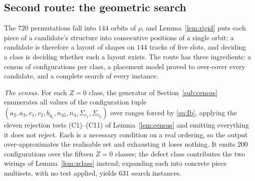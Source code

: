 \documentclass[10pt]{article}
\theoremstyle{remark}
\theoremstyle{plain}
\begin{document}
\subsection{Second route: the geometric search}

The $720$ permutations fall into $144$ orbits of $\rho$, and
Lemma~\ref{lem:rigid} puts each piece of a candidate's structure into
consecutive positions of a single orbit; a candidate is therefore a
layout of shapes on $144$ tracks of five slots, and deciding a class is
deciding whether such a layout exists.  The route has three
ingredients: a census of configurations per class, a placement model
proved to over-cover every candidate, and a complete search of every
instance.

\emph{The census.}  For each $Z=0$ class, the generator of
Section~\ref{sub:census} enumerates all values of the configuration
tuple $(a_2,a_3,c_1,c_2,b_{q_1},n_{45},n_4,\Sigma_{c_1},\Sigma_{c_2})$
over ranges forced by \eqref{eq:Ib}, applying the eleven rejection
tests (C1)--(C11) of Lemma~\ref{lem:census} and emitting everything it
does not reject.  Each is a necessary condition on a real ordering, so
the output over-approximates the realisable set and exhausting it loses
nothing.  It emits $200$ configurations over the fifteen $Z=0$ classes; the
defect class contributes the two wirings of Lemma~\ref{lem:zclass}
instead; expanding each into concrete piece multisets, with no test
applied, yields $631$ search instances.
\end{document}
